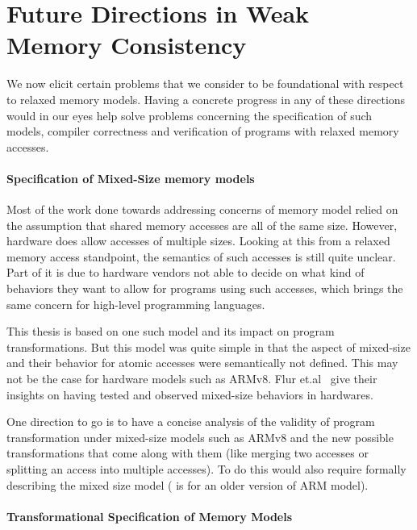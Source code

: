 \section{Future Directions in Weak Memory Consistency}

    We now elicit certain problems that we consider to be foundational with respect to relaxed memory models.
    Having a concrete progress in any of these directions would in our eyes help solve problems concerning the specification of such models, compiler correctness and verification of programs with relaxed memory accesses.

    \paragraph{Specification of Mixed-Size memory models}

        Most of the work done towards addressing concerns of memory model relied on the assumption that shared memory accesses are all of the same size. 
        However, hardware does allow accesses of multiple sizes. 
        Looking at this from a relaxed memory access standpoint, the semantics of such accesses is still quite unclear. 
        Part of it is due to hardware vendors not able to decide on what kind of behaviors they want to allow for programs using such accesses, which brings the same concern for high-level programming languages. 

        This thesis is based on one such model and its impact on program transformations. 
        But this model was quite simple in that the aspect of mixed-size and their behavior for atomic accesses were semantically not defined. This may not be the case for hardware models such as ARMv8. 
        Flur et.al~\cite{Flur} give their insights on having tested and observed mixed-size behaviors in hardwares.

        One direction to go is to have a concise analysis of the validity of program transformation under mixed-size models such as ARMv8 and the new possible transformations that come along with them (like merging two accesses or splitting an access into multiple accesses). 
        To do this would also require formally describing the mixed size model (\cite{Flur} is for an older version of ARM model).  

    \paragraph{Transformational Specification of Memory Models}

